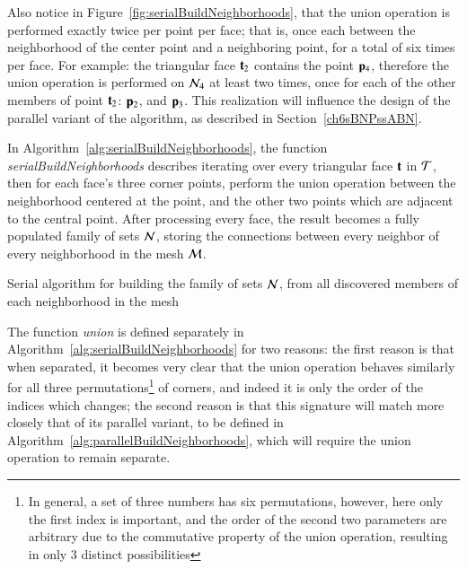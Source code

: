 Also notice in Figure~\ref{fig:serialBuildNeighborhoods}, that the union operation is performed exactly twice per point per face; that is, once each between the neighborhood of the center point and a neighboring point, for a total of six times per face. For example: the triangular face $\mathbf{t}_2$ contains the point $\mathbf{p}_4$, therefore the union operation is performed on $\mathcal{N}_4$ at least two times, once for each of the other members of point $\mathbf{t}_2$: $\mathbf{p}_2$, and $\mathbf{p}_3$. This realization will influence the design of the parallel variant of the algorithm, as described in Section~\ref{ch6sBNPssABN}.


In Algorithm~\ref{alg:serialBuildNeighborhoods}, the function \textit{serialBuildNeighborhoods} describes iterating over every triangular face $\mathbf{t}$ in $\mathcal{T}$, then for each face's three corner points, perform the union operation between the neighborhood centered at the point, and the other two points which are adjacent to the central point. After processing every face, the result becomes a fully populated family of sets $\mathcal{N}$, storing the connections between every neighbor of every neighborhood in the mesh $\mathcal{M}$.

\begin{algorithm}[ht]
	\DontPrintSemicolon


	\bigskip
\nl	{}

	\bigskip
\nl	{}
	\caption{Serial algorithm for building the family of sets $\mathcal{N}$, from all discovered members of each neighborhood in the mesh\label{alg:serialBuildNeighborhoods}}
\end{algorithm}%

The function \textit{union} is defined separately in Algorithm~\ref{alg:serialBuildNeighborhoods} for two reasons: the first reason is that when separated, it becomes very clear that the union operation behaves similarly for all three permutations\footnote{In general, a set of three numbers has six permutations, however, here only the first index is important, and the order of the second two parameters are arbitrary due to the commutative property of the union operation, resulting in only 3 distinct possibilities} of corners, and indeed it is only the order of the indices which changes; the second reason is that this signature will match more closely that of its parallel variant, to be defined in Algorithm~\ref{alg:parallelBuildNeighborhoods}, which will require the union operation to remain separate.

